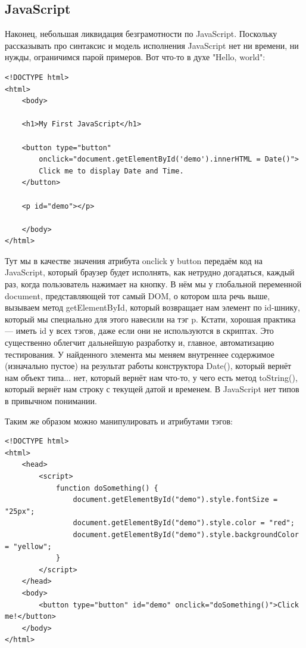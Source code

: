 \documentclass[a5paper]{article}
\begin{document}
\subsection{JavaScript}

Наконец, небольшая ликвидация безграмотности по JavaScript. Поскольку рассказывать про синтаксис и модель исполнения JavaScript нет ни времени, ни нужды, ограничимся парой примеров. Вот что-то в духе "Hello, world":

\begin{verbatim}
<!DOCTYPE html>
<html>
    <body>

    <h1>My First JavaScript</h1>

    <button type="button"
        onclick="document.getElementById('demo').innerHTML = Date()">
        Click me to display Date and Time.
    </button>

    <p id="demo"></p>

    </body>
</html> 
\end{verbatim}

Тут мы в качестве значения атрибута onclick у button передаём код на JavaScript, который браузер будет исполнять, как нетрудно догадаться, каждый раз, когда пользователь нажимает на кнопку. В нём мы у глобальной переменной document, представляющей тот самый DOM, о котором шла речь выше, вызываем метод getElementById, который возвращает нам элемент по id-шнику, который мы специально для этого навесили на тэг p. Кстати, хорошая практика --- иметь id у всех тэгов, даже если они не используются в скриптах. Это существенно облегчит дальнейшую разработку и, главное, автоматизацию тестирования. У найденного элемента мы меняем внутреннее содержимое (изначально пустое) на результат работы конструктора Date(), который вернёт нам объект типа... нет, который вернёт нам что-то, у чего есть метод toString(), который вернёт нам строку с текущей датой и временем. В JavaScript нет типов в привычном понимании.

Таким же образом можно манипулировать и атрибутами тэгов:

\begin{verbatim}
<!DOCTYPE html>
<html>
    <head>
        <script>
            function doSomething() {
                document.getElementById("demo").style.fontSize = "25px";
                document.getElementById("demo").style.color = "red";
                document.getElementById("demo").style.backgroundColor = "yellow";
            }
        </script>
    </head>
    <body>
        <button type="button" id="demo" onclick="doSomething()">Click me!</button>
    </body>
</html>
\end{verbatim}
\end{document}
